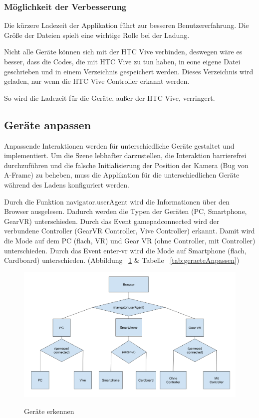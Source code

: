   \subsubsection{Möglichkeit der Verbesserung}
  Die kürzere Ladezeit der Applikation führt zur besseren Benutzererfahrung. Die Größe der Dateien spielt eine wichtige Rolle bei der Ladung.
  
  Nicht alle Geräte können sich mit der HTC Vive verbinden, deswegen wäre es besser, dass die Codes, die mit HTC Vive zu tun haben, in eone eigene Datei geschrieben und in einem Verzeichnis gespeichert werden. Dieses Verzeichnis wird geladen, nur wenn die HTC Vive Controller erkannt werden.
  
  So wird die Ladezeit für die Geräte, außer der HTC Vive, verringert.
  
 \subsection{Geräte anpassen}
 Anpassende Interaktionen werden für unterschiedliche Geräte gestaltet und implementiert. Um die Szene lebhafter darzustellen, die Interaktion barrierefrei durchzuführen und die falsche Initialisierung der Position der Kamera (Bug von A-Frame) zu beheben, muss die Applikation für die unterschiedlichen Geräte während des Ladens konfiguriert werden.
 
 Durch die Funktion {\selectfont navigator.userAgent} wird die Informationen über den Browser ausgelesen. Dadurch werden die Typen der Geräten (PC, Smartphone, GearVR) unterschieden. Durch das Event {\selectfont gamepadconnected} wird der verbundene Controller (GearVR Controller, Vive Controller) erkannt. Damit wird die Mode auf dem PC (flach, VR) und Gear VR (ohne Controller, mit Controller) unterschieden. Durch das Event {\selectfont enter-vr} wird die Mode auf Smartphone (flach, Cardboard) unterschieden. (Abbildung ~\ref{fig:geraeteAnpassen} \& Tabelle ~\ref{tab:geraeteAnpassen}) 
 
\begin{figure}[ht]
\vspace*{1em}
\centering
\caption[Geräte erkennen]{Geräte erkennen}
\includegraphics[width=\textwidth]{images/geraeteAnpassen.png}
\label{fig:geraeteAnpassen} 
\end{figure}

